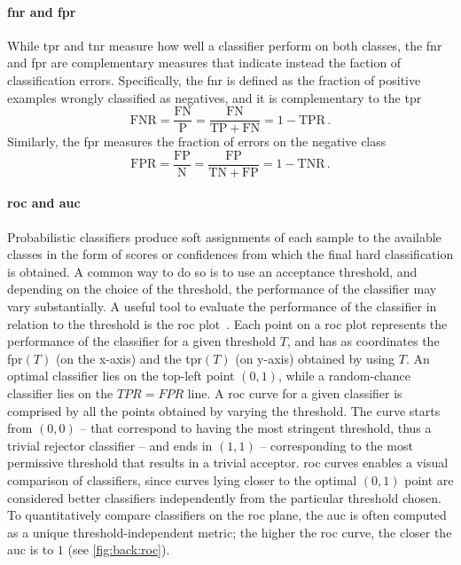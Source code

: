 \paragraph{\acrshort{fnr} and \acrshort{fpr}}
While \gls{tpr} and \gls{tnr} measure how well a classifier perform on both classes, the \gls{fnr} and \gls{fpr} are complementary measures that indicate instead the faction of classification errors.
Specifically, the \gls{fnr} is defined as the fraction of positive examples wrongly classified as negatives, and it is complementary to the \gls{tpr}
\begin{equation} \label{eq:back:fnr}
    \mathrm{FNR} = \frac{\mathrm{FN}}{\mathrm{P}} = \frac{\mathrm{FN}}{\mathrm{TP} + \mathrm{FN}} = 1 - \mathrm{TPR}\,.
\end{equation}
Similarly, the \gls{fpr} measures the fraction of errors on the negative class
\begin{equation} \label{eq:back:fpr}
    \mathrm{FPR} = \frac{\mathrm{FP}}{\mathrm{N}} = \frac{\mathrm{FP}}{\mathrm{TN} + \mathrm{FP}} = 1 - \mathrm{TNR}\,.
\end{equation}

\paragraph{\acrshort{roc} and \acrshort{auc}}
Probabilistic classifiers produce soft assignments of each sample to the available classes in the form of scores or confidences from which the final hard classification is obtained.
A common way to do so is to use an acceptance threshold, and depending on the choice of the threshold, the performance of the classifier may vary substantially.
A useful tool to evaluate the performance of the classifier in relation to the threshold is the \gls{roc} plot~\cite{fawcett2006introduction}.
Each point on a \gls{roc} plot represents the performance of the classifier for a given threshold $T$, and has as coordinates the \gls{fpr}$(T)$ (on the x-axis) and the \gls{tpr}$(T)$ (on y-axis) obtained by using $T$.
An optimal classifier lies on the top-left point $(0,1)$, while a random-chance classifier lies on the $TPR = FPR$ line.
A \gls{roc} curve for a given classifier is comprised by all the points obtained by varying the threshold.
The curve starts from $(0,0)$ -- that correspond to having the most stringent threshold, thus a trivial rejector classifier -- and ends in $(1,1)$ -- corresponding to the most permissive threshold that results in a trivial acceptor.
\Gls{roc} curves enables a visual comparison of classifiers, since curves lying closer to the optimal $(0,1)$ point are considered better classifiers independently from the particular threshold chosen.
To quantitatively compare classifiers on the \gls{roc} plane, the \gls{auc} is often computed as a unique threshold-independent metric;
the higher the \gls{roc} curve, the closer the \gls{auc} is to $1$ (see \ref{fig:back:roc}).

